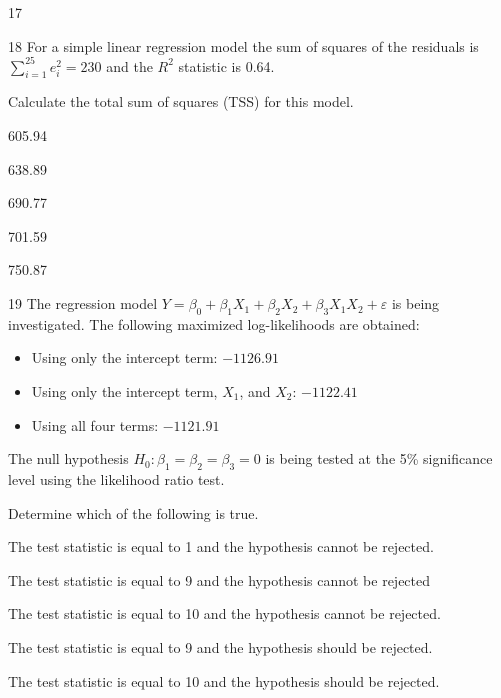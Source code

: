 \begin{question}{17}
\deleted
\end{question}

\begin{question}{18}
For a simple linear regression model the sum of squares of the residuals is $\sum_{i=1}^{25} e_i^2 = 230$ and the $R^2$ statistic is 0.64.

Calculate the total sum of squares (TSS) for this model.

\begin{choices}
\item 605.94
\item 638.89
\item 690.77
\item 701.59
\item 750.87
\end{choices}
\end{question}

\begin{question}{19}
The regression model $Y = \beta_0 + \beta_1 X_1 + \beta_2 X_2 + \beta_3 X_1 X_2 + \varepsilon$ is being investigated. The following maximized log-likelihoods are obtained:
\begin{itemize}
\item Using only the intercept term: $-1126.91$
\item Using only the intercept term, $X_1$, and $X_2$: $-1122.41$
\item Using all four terms: $-1121.91$
\end{itemize}
The null hypothesis $H_0 : \beta_1 = \beta_2 = \beta_3 = 0$ is being tested at the 5\% significance level using the likelihood ratio test.

Determine which of the following is true.

\begin{choices}
\item The test statistic is equal to 1 and the hypothesis cannot be rejected.
\item The test statistic is equal to 9 and the hypothesis cannot be rejected
\item The test statistic is equal to 10 and the hypothesis cannot be rejected.
\item The test statistic is equal to 9 and the hypothesis should be rejected.
\item The test statistic is equal to 10 and the hypothesis should be rejected.
\end{choices}
\end{question}

